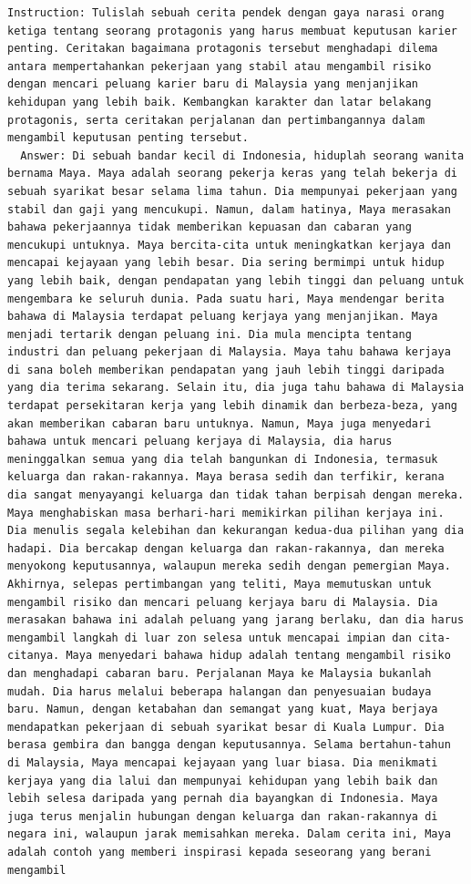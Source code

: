 \documentclass[preprint]{article}
\begin{document}
\begin{lstlisting}[breaklines=true]
  Instruction: Tulislah sebuah cerita pendek dengan gaya narasi orang ketiga tentang seorang protagonis yang harus membuat keputusan karier penting. Ceritakan bagaimana protagonis tersebut menghadapi dilema antara mempertahankan pekerjaan yang stabil atau mengambil risiko dengan mencari peluang karier baru di Malaysia yang menjanjikan kehidupan yang lebih baik. Kembangkan karakter dan latar belakang protagonis, serta ceritakan perjalanan dan pertimbangannya dalam mengambil keputusan penting tersebut.
  Answer: Di sebuah bandar kecil di Indonesia, hiduplah seorang wanita bernama Maya. Maya adalah seorang pekerja keras yang telah bekerja di sebuah syarikat besar selama lima tahun. Dia mempunyai pekerjaan yang stabil dan gaji yang mencukupi. Namun, dalam hatinya, Maya merasakan bahawa pekerjaannya tidak memberikan kepuasan dan cabaran yang mencukupi untuknya. Maya bercita-cita untuk meningkatkan kerjaya dan mencapai kejayaan yang lebih besar. Dia sering bermimpi untuk hidup yang lebih baik, dengan pendapatan yang lebih tinggi dan peluang untuk mengembara ke seluruh dunia. Pada suatu hari, Maya mendengar berita bahawa di Malaysia terdapat peluang kerjaya yang menjanjikan. Maya menjadi tertarik dengan peluang ini. Dia mula mencipta tentang industri dan peluang pekerjaan di Malaysia. Maya tahu bahawa kerjaya di sana boleh memberikan pendapatan yang jauh lebih tinggi daripada yang dia terima sekarang. Selain itu, dia juga tahu bahawa di Malaysia terdapat persekitaran kerja yang lebih dinamik dan berbeza-beza, yang akan memberikan cabaran baru untuknya. Namun, Maya juga menyedari bahawa untuk mencari peluang kerjaya di Malaysia, dia harus meninggalkan semua yang dia telah bangunkan di Indonesia, termasuk keluarga dan rakan-rakannya. Maya berasa sedih dan terfikir, kerana dia sangat menyayangi keluarga dan tidak tahan berpisah dengan mereka. Maya menghabiskan masa berhari-hari memikirkan pilihan kerjaya ini. Dia menulis segala kelebihan dan kekurangan kedua-dua pilihan yang dia hadapi. Dia bercakap dengan keluarga dan rakan-rakannya, dan mereka menyokong keputusannya, walaupun mereka sedih dengan pemergian Maya. Akhirnya, selepas pertimbangan yang teliti, Maya memutuskan untuk mengambil risiko dan mencari peluang kerjaya baru di Malaysia. Dia merasakan bahawa ini adalah peluang yang jarang berlaku, dan dia harus mengambil langkah di luar zon selesa untuk mencapai impian dan cita-citanya. Maya menyedari bahawa hidup adalah tentang mengambil risiko dan menghadapi cabaran baru. Perjalanan Maya ke Malaysia bukanlah mudah. Dia harus melalui beberapa halangan dan penyesuaian budaya baru. Namun, dengan ketabahan dan semangat yang kuat, Maya berjaya mendapatkan pekerjaan di sebuah syarikat besar di Kuala Lumpur. Dia berasa gembira dan bangga dengan keputusannya. Selama bertahun-tahun di Malaysia, Maya mencapai kejayaan yang luar biasa. Dia menikmati kerjaya yang dia lalui dan mempunyai kehidupan yang lebih baik dan lebih selesa daripada yang pernah dia bayangkan di Indonesia. Maya juga terus menjalin hubungan dengan keluarga dan rakan-rakannya di negara ini, walaupun jarak memisahkan mereka. Dalam cerita ini, Maya adalah contoh yang memberi inspirasi kepada seseorang yang berani mengambil 
\end{lstlisting}
\end{document}
